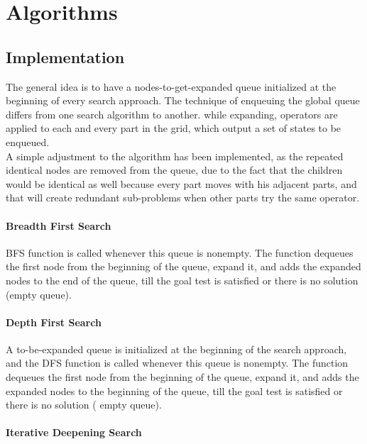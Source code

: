 \chapter{Algorithms}
\section{Implementation}

The general idea is to have a nodes-to-get-expanded queue initialized at the beginning of every search approach. The technique of enqueuing the global queue differs from one search algorithm to another. while expanding, operators are applied to each and every part in the grid, which output a set of states to be enqueued. \\

A simple adjustment to the algorithm has been implemented, as the repeated identical nodes are removed from the queue, due to the fact that the children would be identical as well because every part moves with his adjacent parts, and that will create redundant sub-problems when other parts try the same operator.

\subsubsection{Breadth First Search}

BFS function is called whenever this queue is nonempty. The function dequeues the first node from the beginning of the queue, expand it, and adds the expanded nodes to the end of the queue, till the goal test is satisfied or there is no solution (empty queue).

 

\subsubsection{Depth First Search}

A to-be-expanded queue is initialized at the beginning of the search approach, and the DFS function is called whenever this queue is nonempty. The function dequeues the first node from the beginning of the queue, expand it, and adds the expanded nodes to the beginning of the queue, till the goal test is satisfied or there is no solution ( empty queue). 


\subsubsection{Iterative Deepening Search}

